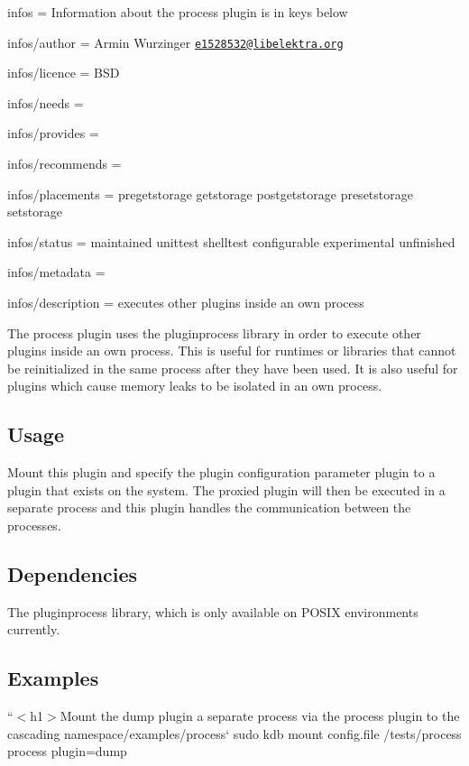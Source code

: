 
\begin{DoxyItemize}
\item infos = Information about the process plugin is in keys below
\item infos/author = Armin Wurzinger \href{mailto:e1528532@libelektra.org}{\tt e1528532@libelektra.\+org}
\item infos/licence = B\+SD
\item infos/needs =
\item infos/provides =
\item infos/recommends =
\item infos/placements = pregetstorage getstorage postgetstorage presetstorage setstorage
\item infos/status = maintained unittest shelltest configurable experimental unfinished
\item infos/metadata =
\item infos/description = executes other plugins inside an own process
\end{DoxyItemize}

The process plugin uses the {\ttfamily pluginprocess} library in order to execute other plugins inside an own process. This is useful for runtimes or libraries that cannot be reinitialized in the same process after they have been used. It is also useful for plugins which cause memory leaks to be isolated in an own process.

\subsection*{Usage}

Mount this plugin and specify the plugin configuration parameter {\ttfamily plugin} to a plugin that exists on the system. The proxied plugin will then be executed in a separate process and this plugin handles the communication between the processes.

\subsection*{Dependencies}

The {\ttfamily pluginprocess} library, which is only available on P\+O\+S\+IX environments currently.

\subsection*{Examples}

``{\ttfamily  $<$h1$>$Mount the dump plugin a separate process via the process plugin to the cascading namespace}/examples/process` sudo kdb mount config.\+file /tests/process process plugin=dump


